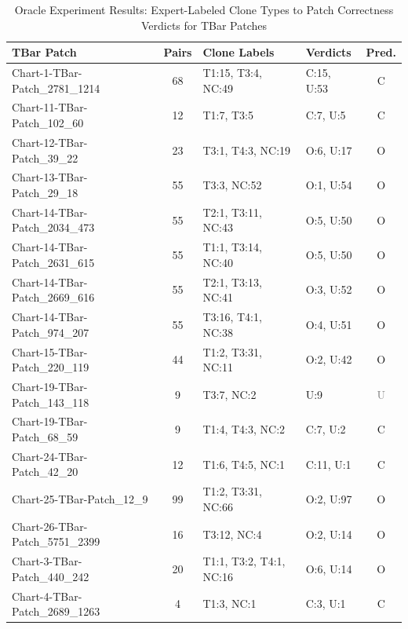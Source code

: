 \begin{table}[t]
\centering
\caption{Oracle Experiment Results: Expert-Labeled Clone Types to Patch Correctness Verdicts for TBar Patches}
\label{tab:oracle-results}
\footnotesize
\renewcommand{\arraystretch}{1.0}
\setlength{\tabcolsep}{4pt}
\begin{tabular}{l|c|l|l|c}
\hline
\textbf{TBar Patch} & \textbf{Pairs} & \textbf{Clone Labels} & \textbf{Verdicts} & \textbf{Pred.} \\
\hline
Chart-1-TBar-Patch\_2781\_1214 & 68 & T1:15, T3:4, NC:49 & C:15, U:53 & \textcolor{green!60!black}{C} \\
Chart-11-TBar-Patch\_102\_60 & 12 & T1:7, T3:5 & C:7, U:5 & \textcolor{green!60!black}{C} \\
Chart-12-TBar-Patch\_39\_22 & 23 & T3:1, T4:3, NC:19 & O:6, U:17 & \textcolor{green!60!black}{O} \\
Chart-13-TBar-Patch\_29\_18 & 55 & T3:3, NC:52 & O:1, U:54 & \textcolor{green!60!black}{O} \\
Chart-14-TBar-Patch\_2034\_473 & 55 & T2:1, T3:11, NC:43 & O:5, U:50 & \textcolor{green!60!black}{O} \\
Chart-14-TBar-Patch\_2631\_615 & 55 & T1:1, T3:14, NC:40 & O:5, U:50 & \textcolor{green!60!black}{O} \\
Chart-14-TBar-Patch\_2669\_616 & 55 & T2:1, T3:13, NC:41 & O:3, U:52 & \textcolor{green!60!black}{O} \\
Chart-14-TBar-Patch\_974\_207 & 55 & T3:16, T4:1, NC:38 & O:4, U:51 & \textcolor{green!60!black}{O} \\
Chart-15-TBar-Patch\_220\_119 & 44 & T1:2, T3:31, NC:11 & O:2, U:42 & \textcolor{green!60!black}{O} \\
Chart-19-TBar-Patch\_143\_118 & 9 & T3:7, NC:2 & U:9 & \textcolor{gray}{U} \\
Chart-19-TBar-Patch\_68\_59 & 9 & T1:4, T4:3, NC:2 & C:7, U:2 & \textcolor{green!60!black}{C} \\
Chart-24-TBar-Patch\_42\_20 & 12 & T1:6, T4:5, NC:1 & C:11, U:1 & \textcolor{green!60!black}{C} \\
Chart-25-TBar-Patch\_12\_9 & 99 & T1:2, T3:31, NC:66 & O:2, U:97 & \textcolor{green!60!black}{O} \\
Chart-26-TBar-Patch\_5751\_2399 & 16 & T3:12, NC:4 & O:2, U:14 & \textcolor{green!60!black}{O} \\
Chart-3-TBar-Patch\_440\_242 & 20 & T1:1, T3:2, T4:1, NC:16 & O:6, U:14 & \textcolor{green!60!black}{O} \\
Chart-4-TBar-Patch\_2689\_1263 & 4 & T1:3, NC:1 & C:3, U:1 & \textcolor{green!60!black}{C} \\

\end{tabular}
\end{table}
